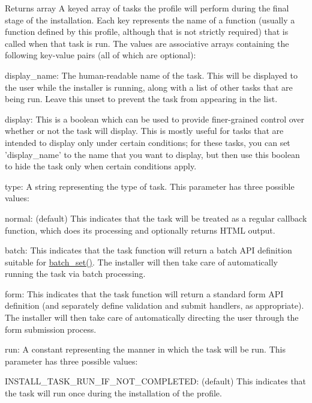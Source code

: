 \begin{DoxyReturn}{Returns}
array A keyed array of tasks the profile will perform during the final stage of the installation. Each key represents the name of a function (usually a function defined by this profile, although that is not strictly required) that is called when that task is run. The values are associative arrays containing the following key-\/value pairs (all of which are optional):
\begin{DoxyItemize}
\item display\_\-name: The human-\/readable name of the task. This will be displayed to the user while the installer is running, along with a list of other tasks that are being run. Leave this unset to prevent the task from appearing in the list.
\item display: This is a boolean which can be used to provide finer-\/grained control over whether or not the task will display. This is mostly useful for tasks that are intended to display only under certain conditions; for these tasks, you can set 'display\_\-name' to the name that you want to display, but then use this boolean to hide the task only when certain conditions apply.
\item type: A string representing the type of task. This parameter has three possible values:
\begin{DoxyItemize}
\item normal: (default) This indicates that the task will be treated as a regular callback function, which does its processing and optionally returns HTML output.
\item batch: This indicates that the task function will return a batch API definition suitable for \hyperlink{group__batch_ga9ff3f18b3bdd1d62ab7ac681a22a7170}{batch\_\-set()}. The installer will then take care of automatically running the task via batch processing.
\item form: This indicates that the task function will return a standard form API definition (and separately define validation and submit handlers, as appropriate). The installer will then take care of automatically directing the user through the form submission process.
\end{DoxyItemize}
\item run: A constant representing the manner in which the task will be run. This parameter has three possible values:
\begin{DoxyItemize}
\item INSTALL\_\-TASK\_\-RUN\_\-IF\_\-NOT\_\-COMPLETED: (default) This indicates that the task will run once during the installation of the profile.

\end{DoxyItemize}
\end{DoxyItemize}
\end{DoxyReturn}
